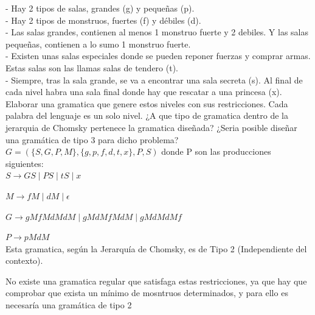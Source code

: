 \documentclass{article}
\begin{document}
\hspace{1cm}- Hay 2 tipos de salas, grandes (g) y pequeñas (p).\\

\hspace{1cm}- Hay 2 tipos de monstruos, fuertes (f) y débiles (d).\\

\hspace{1cm}- Las salas grandes, contienen al menos 1 monstruo fuerte y 2 debiles. Y las salas pequeñas, contienen a lo sumo 1 monstruo fuerte.\\

\hspace{1cm}- Existen unas salas especiales donde se pueden reponer fuerzas y comprar armas. Estas salas son las llamas salas de tendero (t).\\

\hspace{1cm}- Siempre, tras la sala grande, se va a encontrar una sala secreta (s). Al final de cada nivel habra una sala final donde hay que rescatar a una princesa (x).\\

Elaborar una gramatica que genere estos niveles con sus restricciones. Cada palabra del lenguaje es un solo nivel. ¿A que tipo de gramatica dentro de la jerarquia de Chomsky pertenece la gramatica diseñada? ¿Seria posible diseñar una gramática de tipo 3 para dicho problema?\\

\hspace{1cm}	$G = (\{S,G,P,M\},\{g,p,f,d,t,x\},P,S)$ donde P son las producciones siguientes:\\

\hspace{1cm}	$S \rightarrow GS \mid PS \mid tS \mid x$

\hspace{1cm}	$M \rightarrow fM \mid dM \mid \epsilon$

\hspace{1cm}	$G \rightarrow gMfMdMdM \mid gMdMfMdM \mid gMdMdMf$

\hspace{1cm}	$P \rightarrow pMdM$\\

\hspace{1cm}	Esta gramatica, según la Jerarquía de Chomsky, es de Tipo 2 (Independiente del contexto).

\hspace{1cm}	No existe una gramatica regular que satisfaga estas restricciones, ya que hay que comprobar que exista un mínimo de mosntruos determinados, y para ello es necesaría una gramática de tipo 2
\newpage
\end{document}
